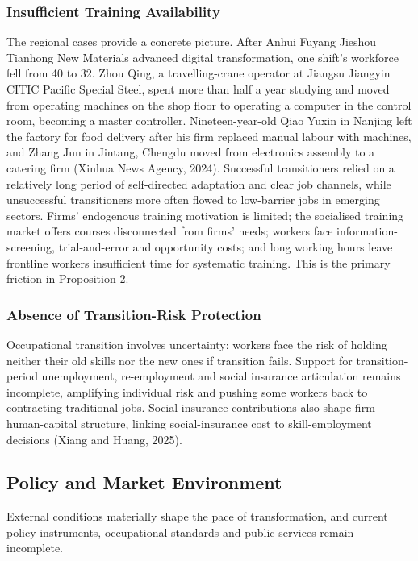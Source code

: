 \documentclass[12pt]{article}
\begin{document}
\subsubsection{Insufficient Training Availability}

The regional cases provide a concrete picture. After Anhui Fuyang Jieshou Tianhong New Materials advanced digital transformation, one shift's workforce fell from 40 to 32. Zhou Qing, a travelling-crane operator at Jiangsu Jiangyin CITIC Pacific Special Steel, spent more than half a year studying and moved from operating machines on the shop floor to operating a computer in the control room, becoming a master controller. Nineteen-year-old Qiao Yuxin in Nanjing left the factory for food delivery after his firm replaced manual labour with machines, and Zhang Jun in Jintang, Chengdu moved from electronics assembly to a catering firm (Xinhua News Agency, 2024). Successful transitioners relied on a relatively long period of self-directed adaptation and clear job channels, while unsuccessful transitioners more often flowed to low-barrier jobs in emerging sectors. Firms' endogenous training motivation is limited; the socialised training market offers courses disconnected from firms' needs; workers face information-screening, trial-and-error and opportunity costs; and long working hours leave frontline workers insufficient time for systematic training. This is the primary friction in Proposition 2.

\subsubsection{Absence of Transition-Risk Protection}

Occupational transition involves uncertainty: workers face the risk of holding neither their old skills nor the new ones if transition fails. Support for transition-period unemployment, re-employment and social insurance articulation remains incomplete, amplifying individual risk and pushing some workers back to contracting traditional jobs. Social insurance contributions also shape firm human-capital structure, linking social-insurance cost to skill-employment decisions (Xiang and Huang, 2025).

\subsection{Policy and Market Environment}

External conditions materially shape the pace of transformation, and current policy instruments, occupational standards and public services remain incomplete.
\end{document}
